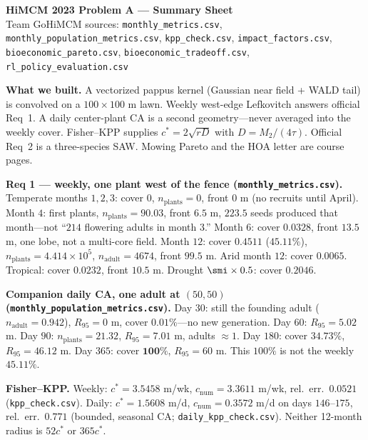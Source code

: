 \documentclass[11pt]{article}
\begin{document}
\begin{center}
{\Large\bfseries HiMCM 2023 Problem A --- Summary Sheet}\\[0.25em]
{\small Team GoHiMCM \quad sources: \texttt{monthly\_metrics.csv},
\texttt{monthly\_population\_metrics.csv},
\texttt{kpp\_check.csv},
\texttt{impact\_factors.csv},
\texttt{bioeconomic\_pareto.csv},
\texttt{bioeconomic\_tradeoff.csv},
\texttt{rl\_policy\_evaluation.csv}}
\end{center}
\vspace{0.4em}

\noindent\textbf{What we built.}
A vectorized pappus kernel (Gaussian near field + WALD tail) is convolved
on a $100\times 100$ m lawn. Weekly west-edge Lefkovitch answers official
Req~1. A daily center-plant CA is a second geometry---never averaged into
the weekly cover. Fisher--KPP supplies $c^{\ast}=2\sqrt{rD}$ with
$D=M_2/(4\tau)$. Official Req~2 is a three-species SAW. Mowing Pareto and
the HOA letter are course pages.

\medskip
\noindent\textbf{Req 1 --- weekly, one plant west of the fence
(\texttt{monthly\_metrics.csv}).}
Temperate months $1,2,3$: cover $0$, $n_{\mathrm{plants}}=0$, front $0$ m
(no recruits until April).
Month $4$: first plants, $n_{\mathrm{plants}}=90.03$, front $6.5$ m,
$223.5$ seeds produced that month---not ``$214$ flowering adults in month $3$.''
Month $6$: cover $0.0328$, front $13.5$ m, one lobe, not a multi-core field.
Month $12$: cover $\mathbf{0.4511}$ ($45.11\%$),
$n_{\mathrm{plants}}=4.414\times 10^{5}$, $n_{\mathrm{adult}}=4674$,
front $99.5$ m.
Arid month $12$: cover $0.0065$. Tropical: cover $0.0232$, front $10.5$ m.
Drought $\smi\times 0.5$: cover $0.2046$.

\medskip
\noindent\textbf{Companion daily CA, one adult at $(50,50)$
(\texttt{monthly\_population\_metrics.csv}).}
Day $30$: still the founding adult ($n_{\mathrm{adult}}=0.942$),
$R_{95}=0$ m, cover $0.01\%$---no new generation.
Day $60$: $R_{95}=5.02$ m.
Day $90$: $n_{\mathrm{plants}}=21.32$, $R_{95}=7.01$ m, adults $\approx 1$.
Day $180$: cover $34.73\%$, $R_{95}=46.12$ m.
Day $365$: cover $\mathbf{100\%}$, $R_{95}=60$ m.
This $100\%$ is not the weekly $45.11\%$.

\medskip
\noindent\textbf{Fisher--KPP.}
Weekly: $c^{\ast}=3.5458$ m/wk, $c_{\mathrm{num}}=3.3611$ m/wk,
rel.\ err.\ $0.0521$ (\texttt{kpp\_check.csv}).
Daily: $c^{\ast}=1.5608$ m/d, $c_{\mathrm{num}}=0.3572$ m/d on days
$146$--$175$, rel.\ err.\ $0.771$ (bounded, seasonal CA;
\texttt{daily\_kpp\_check.csv}).
Neither 12-month radius is $52c^{\ast}$ or $365c^{\ast}$.
\end{document}

